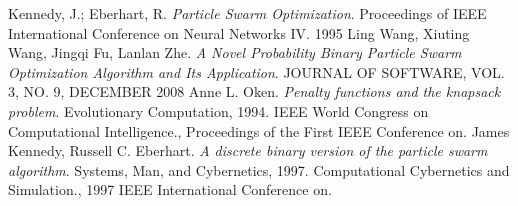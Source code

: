\documentclass{article}
\begin{document}
\newpage

\begin{thebibliography}{99}
		Kennedy, J.; Eberhart, R.
		\emph{Particle Swarm Optimization}.
		Proceedings of IEEE International Conference on Neural Networks IV.
		1995
		Ling Wang, Xiuting Wang, Jingqi Fu, Lanlan Zhe.
	  	\emph{A Novel Probability Binary Particle Swarm Optimization Algorithm and Its Application}.
	  	JOURNAL OF SOFTWARE, VOL. 3, NO. 9, DECEMBER 2008
		Anne L. Oken.
		\emph{Penalty functions and the knapsack problem}.
		Evolutionary Computation, 1994. IEEE World Congress on Computational Intelligence., Proceedings of the First IEEE Conference on.
		James Kennedy, Russell C. Eberhart.
		\emph{A discrete binary version of the particle swarm algorithm}.
		Systems, Man, and Cybernetics, 1997. Computational Cybernetics and Simulation., 1997 IEEE International Conference on.
\end{thebibliography}
\end{document}
